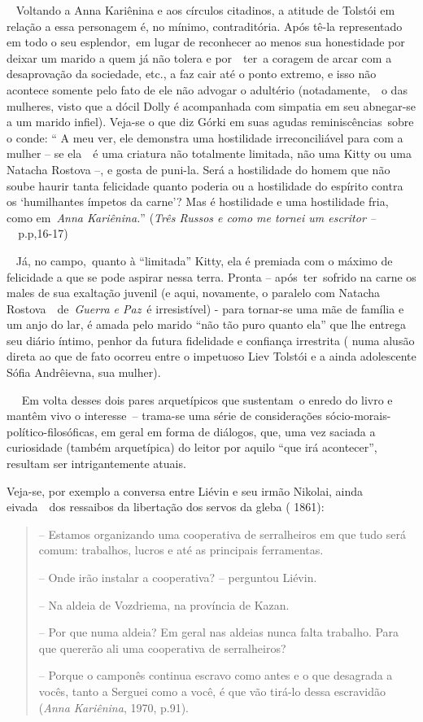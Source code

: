 ~ Voltando a Anna Kariênina e aos círculos citadinos, a atitude de
Tolstói em relação a essa personagem é, no mínimo, contraditória. Após
tê-la representado em todo o seu esplendor,~em lugar de reconhecer ao
menos sua honestidade por deixar um marido a quem já não tolera e
por~~ter~a coragem de arcar com a desaprovação da sociedade, etc., a faz
cair até o ponto extremo, e isso não acontece somente pelo fato de ele
não advogar o adultério (notadamente,~~o das mulheres, visto que a dócil
Dolly é acompanhada com simpatia em seu abnegar-se a um marido infiel).
Veja-se o que diz Górki em suas agudas reminiscências~sobre o conde: ``
A meu ver, ele demonstra uma hostilidade irreconciliável para com a
mulher -- se ela~~é uma criatura não totalmente limitada, não uma Kitty
ou uma Natacha Rostova --, e gosta de puni-la. Será a hostilidade do
homem que não soube haurir tanta felicidade quanto poderia ou a
hostilidade do espírito contra os `humilhantes ímpetos da carne'? Mas é
hostilidade e uma hostilidade fria, como em~\emph{Anna Kariênina.}''
(\emph{Três Russos e como me tornei um escritor --~}~p.p,16-17)

\emph{~} Já, no campo,~quanto à ``limitada'' Kitty, ela é premiada com o
máximo de felicidade a que se pode aspirar nessa terra. Pronta --
após~ter~sofrido na carne os males de sua exaltação juvenil (e aqui,
novamente, o paralelo com Natacha Rostova~~de~\emph{Guerra e Paz}~é
irresistível) - para tornar-se uma mãe de família e um anjo do lar, é
amada pelo marido ``não tão puro quanto ela'' que lhe entrega seu diário
íntimo, penhor da futura fidelidade e confiança irrestrita ( numa alusão
direta ao que de fato ocorreu entre o impetuoso Liev Tolstói e a ainda
adolescente Sófia Andrêievna, sua mulher).

~~ Em volta desses dois pares arquetípicos que sustentam~o enredo do
livro e mantêm vivo o interesse~-- trama-se uma série de considerações
sócio-morais-político-filosóficas, em geral em forma de diálogos, que,
uma vez saciada a curiosidade (também arquetípica) do leitor por aquilo
``que irá acontecer'', resultam ser intrigantemente atuais.

Veja-se, por exemplo a conversa entre Liévin e seu irmão Nikolai, ainda
eivada~~dos ressaibos da libertação dos servos da gleba ( 1861):

\begin{quote}
-- Estamos organizando uma cooperativa de serralheiros em que tudo será
comum: trabalhos, lucros e até as principais ferramentas.

-- Onde irão instalar a cooperativa? -- perguntou Liévin.

-- Na aldeia de Vozdriema, na província de Kazan.

-- Por que numa aldeia? Em geral nas aldeias nunca falta trabalho. Para
que quererão ali uma cooperativa de serralheiros?

-- Porque o camponês continua escravo como antes e o que desagrada a
vocês, tanto a Serguei como a você, é que vão tirá-lo dessa escravidão
(\emph{Anna Kariênina}, 1970, p.91).
\end{quote}

